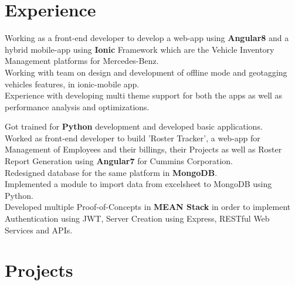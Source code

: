 \documentclass[]{jaydeep-resume-openfont}
\begin{document}
\begin{minipage}[t]{0.70\textwidth}


\section{Experience}

\textbullet{} Working as a front-end developer to develop a web-app using \textbf{Angular8} and a hybrid mobile-app using \textbf{Ionic} Framework which are the Vehicle Inventory Management platforms for Mercedes-Benz.\\
\textbullet{} Working with team on design and development of offline mode and geotagging vehicles features, in ionic-mobile app. \\
\textbullet{} Experience with developing multi theme support for both the apps as well as performance analysis and optimizations. \\
\sectionsep

\textbullet{} Got trained for \textbf{Python}  development and developed basic applications.\\
\textbullet{} Worked as front-end developer to build 'Roster Tracker', a web-app for Management of Employees and their billings, their Projects as well as Roster Report Generation using \textbf{Angular7} for Cummins Corporation. \\
\textbullet{} Redesigned database for the same platform in \textbf{MongoDB}. \\
\textbullet{} Implemented a module to import data from excelsheet to MongoDB using Python. \\
\textbullet{} Developed multiple Proof-of-Concepts in \textbf{MEAN Stack} in order to implement Authentication using JWT, Server Creation using Express, RESTful Web Services and APIs. \\
\sectionsep


\section{Projects}


\end{minipage}
\end{document}
